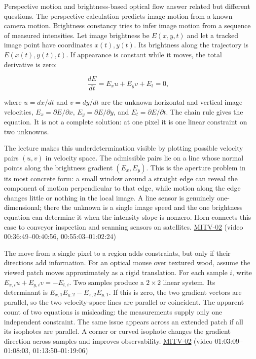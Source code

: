 Perspective motion and brightness-based optical flow answer related but different questions. The perspective calculation predicts image motion from a known camera motion. Brightness constancy tries to infer image motion from a sequence of measured intensities. Let image brightness be \(E(x,y,t)\) and let a tracked image point have coordinates \(x(t),y(t)\). Its brightness along the trajectory is \(E(x(t),y(t),t)\). If appearance is constant while it moves, the total derivative is zero:

\[
\frac{dE}{dt}=E_x u+E_y v+E_t=0,
\]

where \(u=dx/dt\) and \(v=dy/dt\) are the unknown horizontal and vertical image velocities, \(E_x=\partial E/\partial x\), \(E_y=\partial E/\partial y\), and \(E_t=\partial E/\partial t\). The chain rule gives the equation. It is not a complete solution: at one pixel it is one linear constraint on two unknowns.

The lecture makes this underdetermination visible by plotting possible velocity pairs \((u,v)\) in velocity space. The admissible pairs lie on a line whose normal points along the brightness gradient \((E_x,E_y)\). This is the aperture problem in its most concrete form: a small window around a straight edge can reveal the component of motion perpendicular to that edge, while motion along the edge changes little or nothing in the local image. A line sensor is genuinely one-dimensional; there the unknown is a single image speed and the one brightness equation can determine it when the intensity slope is nonzero. Horn connects this case to conveyor inspection and scanning sensors on satellites. \hyperref[04-visual-computing-ii-ch036-mitv-02---image-formation-perspective-projection-time-derivative-motion-field]{MITV-02} (video 00:36:49--00:40:56, 00:55:03--01:02:24)

The move from a single pixel to a region adds constraints, but only if their directions add information. For an optical mouse over textured wood, assume the viewed patch moves approximately as a rigid translation. For each sample \(i\), write \(E_{x,i}u+E_{y,i}v=-E_{t,i}\). Two samples produce a \(2\times2\) linear system. Its determinant is \(E_{x,1}E_{y,2}-E_{x,2}E_{y,1}\). If this is zero, the two gradient vectors are parallel, so the two velocity-space lines are parallel or coincident. The apparent count of two equations is misleading: the measurements supply only one independent constraint. The same issue appears across an extended patch if all its isophotes are parallel. A corner or curved isophote changes the gradient direction across samples and improves observability. \hyperref[04-visual-computing-ii-ch036-mitv-02---image-formation-perspective-projection-time-derivative-motion-field]{MITV-02} (video 01:03:09--01:08:03, 01:13:50--01:19:06)

